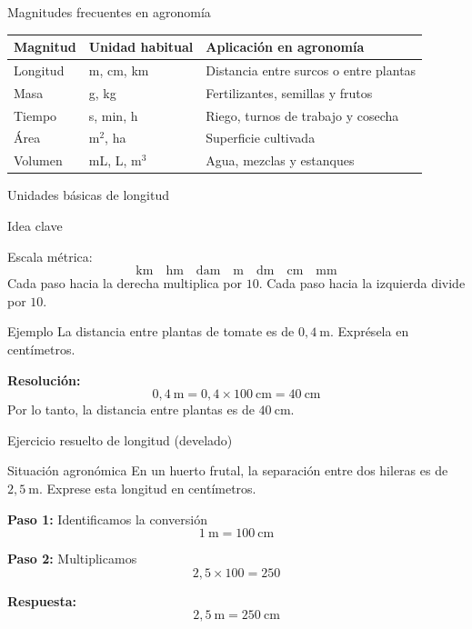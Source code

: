 \documentclass[handout,aspectratio=169,10pt]{beamer}
\newcommand{\idea}[1]{
	\begin{block}{Idea clave}
		#1
	\end{block}
}
\newcommand{\ejemplo}[2]{
	\begin{exampleblock}{Ejemplo}
		#1
		
		\vspace{0.5em}
		\textbf{Resolución:} #2
	\end{exampleblock}
}
\begin{document}
	\begin{frame}{Magnitudes frecuentes en agronomía}
		\small
		\begin{tabular}{>{\raggedright\arraybackslash}p{2.2cm} >{\raggedright\arraybackslash}p{2.2cm} >{\raggedright\arraybackslash}p{6cm}}
			\toprule
			\textbf{Magnitud} & \textbf{Unidad habitual} & \textbf{Aplicación en agronomía} \\
			\midrule
			Longitud & m, cm, km & Distancia entre surcos o entre plantas \\
			\pause
			Masa & g, kg & Fertilizantes, semillas y frutos \\
			\pause
			Tiempo & s, min, h & Riego, turnos de trabajo y cosecha \\
			\pause
			Área & m$^2$, ha & Superficie cultivada \\
			\pause
			Volumen & mL, L, m$^3$ & Agua, mezclas y estanques \\
			\bottomrule
		\end{tabular}
	\end{frame}
	
	\begin{frame}{Unidades básicas de longitud}
		\idea{
			Escala métrica:
			\[
			\text{km}\quad \text{hm}\quad \text{dam}\quad \text{m}\quad \text{dm}\quad \text{cm}\quad \text{mm}
			\]
			Cada paso hacia la derecha multiplica por \(10\).  
			Cada paso hacia la izquierda divide por \(10\).
		}
		
		\pause
		\ejemplo
		{La distancia entre plantas de tomate es de \(0{,}4\ \text{m}\). Exprésela en centímetros.}
		{
			\[
			0{,}4\ \text{m} = 0{,}4 \times 100\ \text{cm} = 40\ \text{cm}
			\]
			Por lo tanto, la distancia entre plantas es de \(\boxed{40\ \text{cm}}\).
		}
	\end{frame}
	
	\begin{frame}{Ejercicio resuelto de longitud (develado)}
		\begin{block}{Situación agronómica}
			En un huerto frutal, la separación entre dos hileras es de \(2{,}5\ \text{m}\).  
			Exprese esta longitud en centímetros.
		\end{block}
		
		\pause
		\textbf{Paso 1:} Identificamos la conversión
		\[
		1\ \text{m} = 100\ \text{cm}
		\]
		
		\pause
		\textbf{Paso 2:} Multiplicamos
		\[
		2{,}5 \times 100 = 250
		\]
		
		\pause
		\textbf{Respuesta:}
		\[
		2{,}5\ \text{m} = \boxed{250\ \text{cm}}
		\]
	\end{frame}
	
\end{document}
